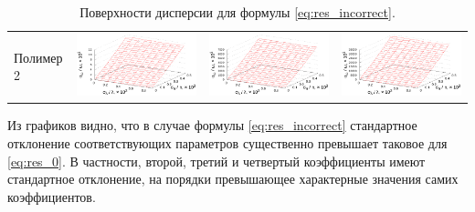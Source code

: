 \documentclass[12pt,a4paper]{article}
\begin{document}
\begin{table}[h]
\begin{tabular}{l | c c c}
	\begin{rotate}{90}Полимер 2\end{rotate} &	\includegraphics[scale=0.4]{figs/all/p2.txt_coeff0.dat.eps} & \includegraphics[scale=0.4]{figs/all/p2.txt_coeff1.dat.eps} & \includegraphics[scale=0.4]{figs/all/p2.txt_coeff2.dat.eps}
  \end{tabular}
  \caption{Поверхности дисперсии для формулы \eqref{eq:res_incorrect}.}
  \label{tabl:res_incorrect}
\end{table}

Из графиков видно, что в случае формулы \eqref{eq:res_incorrect} стандартное
отклонение соответствующих параметров существенно превышает таковое для
\eqref{eq:res_0}. В частности, второй, третий и четвертый коэффициенты имеют
стандартное отклонение, на порядки превышающее характерные значения самих
коэффициентов.
\end{document}
